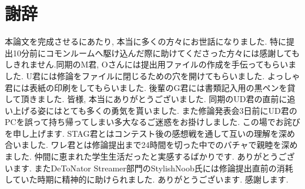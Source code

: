 \documentclass[../main.tex]{subfiles}
\begin{document}
\section*{謝辞}

本論文を完成させるにあたり, 本当に多くの方々にお世話になりました. 特に提出10分前にコモンルームへ駆け込んだ際に助けてくださった方々には感謝してもしきれません.同期のM君, Oさんには提出用ファイルの作成を手伝ってもらいました. U君には修論をファイルに閉じるための穴を開けてもらいました. よっしゃ君には表紙の印刷をしてもらいました. 後輩のG君には書類記入用の黒ペンを貸して頂きました. 皆様, 本当にありがとうございました.
同期のUD君の直前に追い上げる姿にはとても多くの勇気を貰いました. また修論発表会3日前にUD君のPCを誤って持ち帰ってしまい多大なるご迷惑をお掛けしました. この場でお詫びを申し上げます. STAG君とはコンテスト後の感想戦を通して互いの理解を深め合いました. ワレ君とは修論提出まで24時間を切った中でのバチャで親睦を深めました. 仲間に恵まれた学生生活だったと実感するばかりです. ありがとうございます.
またDeToNator Streamer部門のStylishNoob氏には修論提出直前の消耗していた時期に精神的に助けられました. ありがとうございます. 感謝します.
\end{document}
